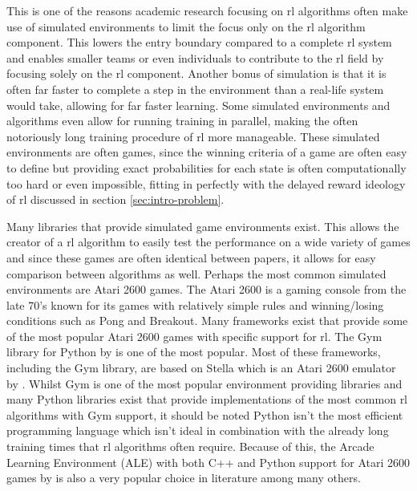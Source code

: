 This is one of the reasons academic research focusing on \gls{rl} algorithms often make use of simulated environments to limit the focus only on the \gls{rl} algorithm component.
This lowers the entry boundary compared to a complete \gls{rl} system and enables smaller teams or even individuals to contribute to the \gls{rl} field by focusing solely on the \gls{rl} component.  
Another bonus of simulation is that it is often far faster to complete a step in the environment than a real-life system would take, allowing for far faster learning.
Some simulated environments and algorithms even allow for running training in parallel, making the often notoriously long training procedure of \gls{rl} more manageable.
These simulated environments are often games, since the winning criteria of a game are often easy to define but providing exact probabilities for each state is often computationally too hard or even impossible, fitting in perfectly with the delayed reward ideology of \gls{rl} discussed in section \ref{sec:intro-problem}.

Many libraries that provide simulated game environments exist.
This allows the creator of a \gls{rl} algorithm to easily test the performance on a wide variety of games and since these games are often identical between papers, it allows for easy comparison between algorithms as well.
Perhaps the most common simulated environments are Atari 2600 games.
The Atari 2600 is a gaming console from the late 70's known for its games with relatively simple rules and winning/losing conditions such as Pong and Breakout.
Many frameworks exist that provide some of the most popular Atari 2600 games with specific support for \gls{rl}.
The Gym library for Python by \citet[OpenAI]{gym} is one of the most popular.
Most of these frameworks, including the Gym library, are based on Stella which is an Atari 2600 emulator by \citet{stella}.
Whilst Gym is one of the most popular environment providing libraries and many Python libraries exist that provide implementations of the most common \gls{rl} algorithms with Gym support, it should be noted Python isn't the most efficient programming language which isn't ideal in combination with the already long training times that \gls{rl} algorithms often require.
Because of this, the Arcade Learning Environment (ALE) with both C++ and Python support for Atari 2600 games by \citet{ale} is also a very popular choice in literature among many others.

